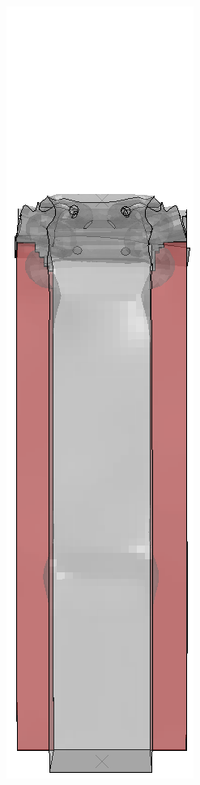 \documentclass[
documentsize = a4, %
font = cmr, %
typesize = 11, %
printmode = true,
onehalfspacing = true,
language = en, %
titlepage = udciccp, %
degree = pt, %
dedication = true,
acknowledgements = true,
abstract-en = true,
abstract-es = false,
abstract-ga = false,
epigraphs = true,
toc = true,
lof = true,
lot = true,
frontmatterintoc = false,
notation = false,
minimal = false,
]{UDCthesis}
\begin{document}
\begin{figure}
\begin{minipage}[b]{.06\linewidth}
	\end{minipage}
	\quad
	\begin{minipage}[b]{.06\linewidth}
		\centering
		\includegraphics[width=\linewidth]{IMG_CUTRES/a5}

\end{minipage}
\end{figure}
\end{document}
